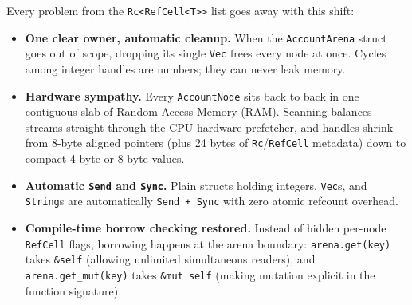 Every problem from the \texttt{Rc<RefCell<T>>} list goes away with this shift:
\begin{itemize}
  \item \textbf{One clear owner, automatic cleanup.} When the \texttt{AccountArena} struct goes out of scope, dropping its single \texttt{Vec} frees every node at once. Cycles among integer handles are numbers; they can never leak memory.
  \item \textbf{Hardware sympathy.} Every \texttt{AccountNode} sits back to back in one contiguous slab of Random-Access Memory (RAM). Scanning balances streams straight through the CPU hardware prefetcher, and handles shrink from 8-byte aligned pointers (plus 24 bytes of \texttt{Rc}/\texttt{RefCell} metadata) down to compact 4-byte or 8-byte values.
  \item \textbf{Automatic \texttt{Send} and \texttt{Sync}.} Plain structs holding integers, \texttt{Vec}s, and \texttt{String}s are automatically \texttt{Send + Sync} with zero atomic refcount overhead.
  \item \textbf{Compile-time borrow checking restored.} Instead of hidden per-node \texttt{RefCell} flags, borrowing happens at the arena boundary: \texttt{arena.get(key)} takes \texttt{\&self} (allowing unlimited simultaneous readers), and \texttt{arena.get\_mut(key)} takes \texttt{\&mut self} (making mutation explicit in the function signature).
\end{itemize}

